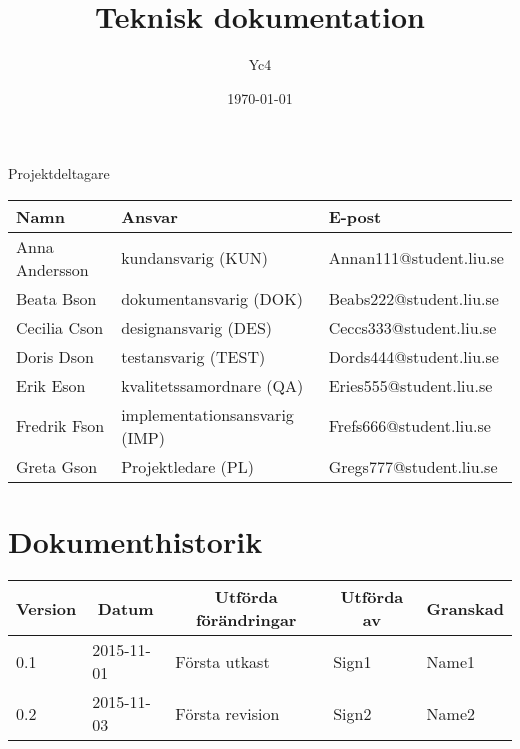 \documentclass[10pt,oneside,swedish]{lips-no_customer}
\title{Teknisk dokumentation}
\author{Yc4}
\date{\today}
\begin{document}
\maketitle

\cleardoublepage
\makeprojectid

\begin{center}
  \Large Projektdeltagare
\end{center}
\begin{center}
  \begin{tabular}{|l|l|l|}
    \hline
    \textbf{Namn} & \textbf{Ansvar} & \textbf{E-post}\\
    \hline
    Anna Andersson & kundansvarig (KUN) & Annan111@student.liu.se\\
    \hline
    Beata Bson & dokumentansvarig (DOK) & Beabs222@student.liu.se\\
    \hline
    Cecilia Cson & designansvarig (DES) & Ceccs333@student.liu.se\\
    \hline
    Doris Dson & testansvarig (TEST) & Dords444@student.liu.se\\
    \hline
    Erik Eson & kvalitetssamordnare (QA) & Eries555@student.liu.se\\
    \hline
    Fredrik Fson & implementationsansvarig (IMP) & Frefs666@student.liu.se\\
    \hline
    Greta Gson & Projektledare (PL) & Gregs777@student.liu.se\\
    \hline
  \end{tabular}
\end{center}


\cleardoublepage
\tableofcontents

\cleardoublepage
\section*{Dokumenthistorik}
\begin{tabular}{p{}|p{}|p{}|p{}|p{}} 
  \multicolumn{1}{c}{\bfseries Version} & 
  \multicolumn{1}{|c}{\bfseries Datum} & 
  \multicolumn{1}{|c}{\bfseries Utförda förändringar} & 
  \multicolumn{1}{|c}{\bfseries Utförda av} & 
  \multicolumn{1}{|c}{\bfseries Granskad}\\
  \hline
  \hline
  0.1 & 2015-11-01 & Första utkast & Sign1 & Name1   \\
  \hline
  0.2 & 2015-11-03 & Första revision & Sign2 & Name2   \\
  \hline
\end{tabular}
\end{document}
